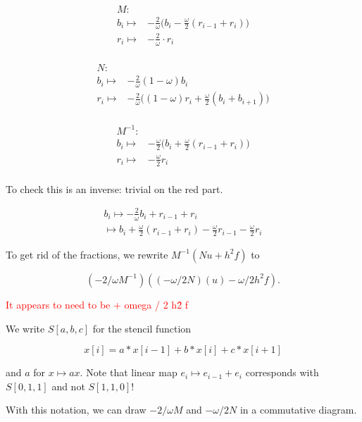 \documentclass{article}
\DeclareMathOperator{\id}{id}
\begin{document}
\begin{align*}
    M : & \\
    b_{i} \mapsto & -\frac{2}{\omega}\big(b_{i} - \frac{\omega}{2} (r_{i - 1} + r_{i}) \big) \\
    r_{i} \mapsto & -\frac{2}{\omega}\cdot r_{i} \\
\end{align*}

\begin{align*}
    N : & \\
    b_{i} \mapsto & -\frac{2}{\omega}(1 - \omega)b_{i} \\
    r_{i} \mapsto & -\frac{2}{\omega}\big((1 - \omega)r_{i} + \frac{\omega}{2} (b_{i} + b_{i + 1}) \big) \\
\end{align*}

\begin{align*}
    M^{-1} : & \\
    b_{i} \mapsto & -\frac{\omega}{2}\big(b_{i} + \frac{\omega}{2} (r_{i - 1} + r_{i}) \big) \\
    r_{i} \mapsto & -\frac{\omega}{2} r_{i} \\
\end{align*}

To check this is an inverse: trivial on the red part.

\begin{align*}
b_i \mapsto -\frac{2}{\omega}b_{i} + r_{i - 1} + r_{i} \\
    \mapsto  b_{i} +\frac{\omega}{2} (r_{i - 1} + r_{i}) - \frac{\omega}{2} r_{i - 1} - \frac{\omega}{2} r_i
\end{align*}

To get rid of the fractions, we rewrite $M^{-1}(Nu + h^2 f)$ to 

\[
    (-2 / \omega M^{-1})\left((-\omega / 2 N)(u) - \omega / 2 h^2 f\right).
\]

\textcolor{red}{It appears to need to be + omega / 2 h\^2 f}

We write $S[a, b, c]$ for the stencil function 

\[
    x[i] = a * x[i - 1] + b * x[i] + c * x[i + 1]
\]

and $a$ for $x \mapsto ax$. Note that linear map $e_i \mapsto e_{i - 1} + e_i$
corresponds with $S[0, 1, 1]$ and not $S[1, 1, 0]$!

With this notation, we can draw 
$-2 / \omega M$ and $-\omega / 2 N$ in a commutative diagram.

\end{document}
